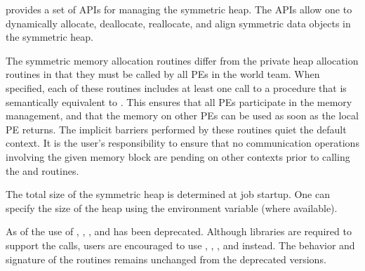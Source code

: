\openshmem provides a set of \acp{API} for managing the symmetric heap. The
\acp{API} allow one to dynamically allocate, deallocate, reallocate, and align
symmetric data objects in the symmetric heap.

The symmetric memory allocation routines differ from the private heap
allocation routines in that they must be called by all \acp{PE} in
the world team.  When specified, each of these routines includes at
least one call to a procedure that is semantically equivalent to
.  This ensures that all \acp{PE}
participate in the memory management, and that the memory on other
\acp{PE} can be used as soon as the local \ac{PE} returns.  The
implicit barriers performed by these routines quiet the default
context.  It is the user's responsibility to ensure that no
communication operations involving the given memory block are pending
on other contexts prior to calling the  and
 routines.

The total size of the symmetric heap is determined at job startup.  One can
specify the size of the heap using the  environment
variable (where available).

\begin{DeprecateBlock}
  As of \openshmem[1.2] the use of , ,
  ,  and  has been deprecated. Although \openshmem
  libraries are required to support the calls, users are encouraged to use
  , , , and
   instead.  The behavior and signature  of the routines
  remains unchanged from the deprecated versions.
\end{DeprecateBlock}


